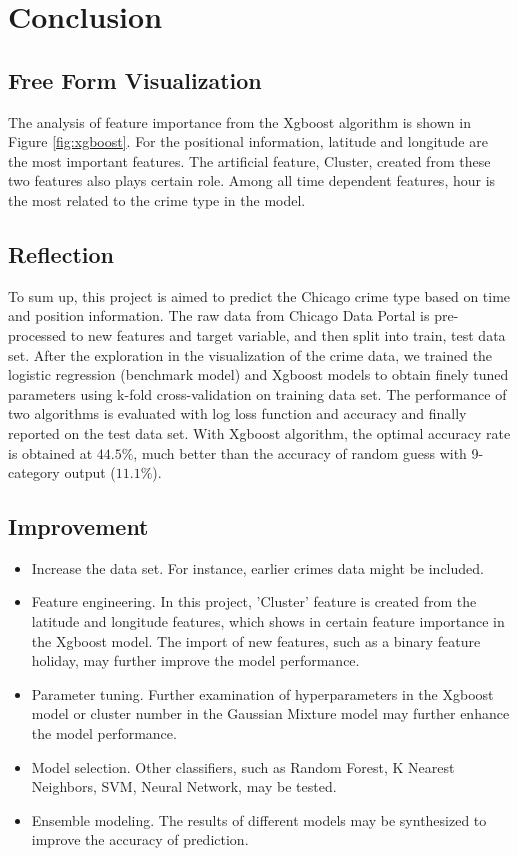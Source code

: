 \documentclass[12pt]{article}
\begin{document}
\section{Conclusion}
\subsection{Free Form Visualization}
The analysis of feature importance from the Xgboost algorithm is shown in Figure \ref{fig:xgboost}. For the positional information, latitude and longitude are the most important features. The artificial feature, Cluster, created from these two features also plays certain role. Among all time dependent features, hour is the most related to the crime type in the model. 
\subsection{Reflection}
To sum up, this project is aimed to predict the Chicago crime type based on time and position information. The raw data from Chicago Data Portal is pre-processed to new features and target variable, and then split into train, test data set. After the exploration in the visualization of the crime data, we trained the logistic regression (benchmark model) and Xgboost models to obtain finely tuned parameters using k-fold cross-validation on training data set. The performance of two algorithms is evaluated with log loss function and accuracy and finally reported on the test data set. With Xgboost algorithm, the optimal accuracy rate is obtained at $44.5\%$, much better than the accuracy of random guess with 9-category output ($11.1\%$). 
\subsection{Improvement}
\begin{itemize}
\item Increase the data set. For instance, earlier crimes data might be included.
\item Feature engineering. In this project, 'Cluster' feature is created from the latitude and longitude features, which shows in certain feature importance in the Xgboost model. The import of new features, such as a binary feature holiday, may further improve the model performance.
\item Parameter tuning. Further examination of hyperparameters in the Xgboost model or cluster number in the Gaussian Mixture model may further enhance the model performance. 
\item Model selection. Other classifiers, such as Random Forest, K Nearest Neighbors, SVM, Neural Network, may be tested. 
\item Ensemble modeling. The results of different models may be synthesized to improve the accuracy of prediction.
\end{itemize}
\end{document}
